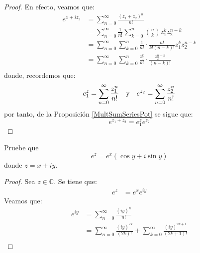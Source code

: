 \documentclass[12pt]{report}
\newcounter{it}
\theoremstyle{largebreak}
\begin{document}
    \begin{proof}
        En efecto, veamos que:
        \begin{equation*}
            \begin{split}
                e^{ x+iz_2}&=\sum_{ n=0}^\infty\frac{(z_1+z_2)^n}{n!}\\
                &=\sum_{ n=0}^\infty\frac{1}{n!}\sum_{ k=0}^n\binom{n}{k}z_1^kz_2^{ n-k}\\
                &=\sum_{ n=0}^\infty\sum_{ k=0}^n\frac{1}{n!}\cdot\frac{n!}{k!(n-k)!}z_1^kz_2^{ n-k}\\
                &=\sum_{ n=0}^\infty\sum_{ k=0}^n\frac{z_1^k}{k!}\cdot\frac{z_2^{n-k}}{(n-k)!}\\
            \end{split}
        \end{equation*}
        donde, recordemos que:
        \begin{equation*}
            e^z_1=\sum_{ n=0}^\infty\frac{z_1^n}{n!}\quad\textup{y}\quad e^ {z_2}=\sum_{ n=0}^\infty\frac{z_2^n}{n!}
        \end{equation*}
        por tanto, de la Proposición \ref{MultSumSeriesPot} se sigue que:
        \begin{equation*}
            e^{ z_1+z_2}=e^z_1e^{ z_2}
        \end{equation*}
    \end{proof}

    \begin{excer}
        Pruebe que
        \begin{equation*}
            e^z=e^x(\cos y+i\sin y)
        \end{equation*}
        donde $z=x+iy$.
    \end{excer}

    \begin{proof}
        Sea $z\in\mathbb{C}$. Se tiene que:
        \begin{equation*}
            \begin{split}
                e^z&=e^{x}e^{iy}
            \end{split}
        \end{equation*}
        Veamos que:
        \begin{equation*}
            \begin{split}
                e^{ iy}&=\sum_{n=0}^\infty\frac{(iy)^n}{n!}\\
                &=\sum_{n=0}^\infty\frac{(iy)^{2k}}{(2k)!}+\sum_{k=0}^\infty\frac{(iy)^{2k+1}}{(2k+1)!}\\
            \end{split}
        \end{equation*}
    \end{proof}
\end{document}
